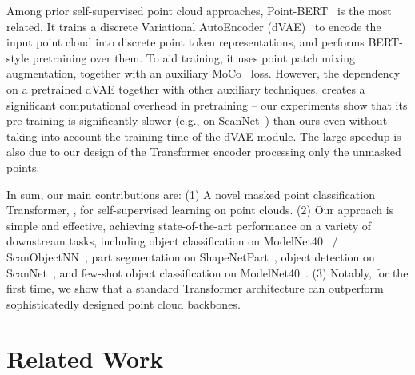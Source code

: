 \documentclass[runningheads]{llncs}
\begin{document}
Among prior self-supervised point cloud approaches, Point-BERT~\cite{yu2021point} is the most related.  It trains a discrete Variational AutoEncoder (dVAE)~\cite{dvae} to encode the input point cloud into discrete point token representations, and performs BERT-style pretraining over them.
To aid training, it uses point patch mixing augmentation, together with an auxiliary MoCo~\cite{he2020momentum} loss.
However, the dependency on a pretrained dVAE together with other auxiliary techniques, creates a significant computational overhead in pretraining -- our experiments show that its pre-training is significantly slower (e.g.,  on ScanNet~\cite{dai2017scannet}) than ours even without taking into account the training time of the dVAE module.
The large speedup is also due to our design of the Transformer encoder processing only the unmasked points.

In sum, our main contributions are: (1) A novel masked point classification Transformer, \emph{\methodname{}}, for self-supervised learning on point clouds. (2) Our approach is simple and effective, achieving state-of-the-art performance on a variety of downstream tasks, including object classification on ModelNet40~\cite{wu20153d} / ScanObjectNN~\cite{uy2019revisiting}, part segmentation on ShapeNetPart~\cite{yi2016scalable}, object detection on ScanNet~\cite{dai2017scannet}, and few-shot object classification on ModelNet40~\cite{wu20153d}. (3) Notably, for the first time, we show that a standard Transformer architecture can outperform sophisticatedly designed point cloud backbones. \section{Related Work}
\end{document}
